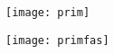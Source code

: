 



\pagestyle{empty}
\begin{figure}
	\centering
	\texttt{[image: prim]}
\end{figure} 

\begin{figure}
	\centering
	\texttt{[image: primfas]}
\end{figure}	
